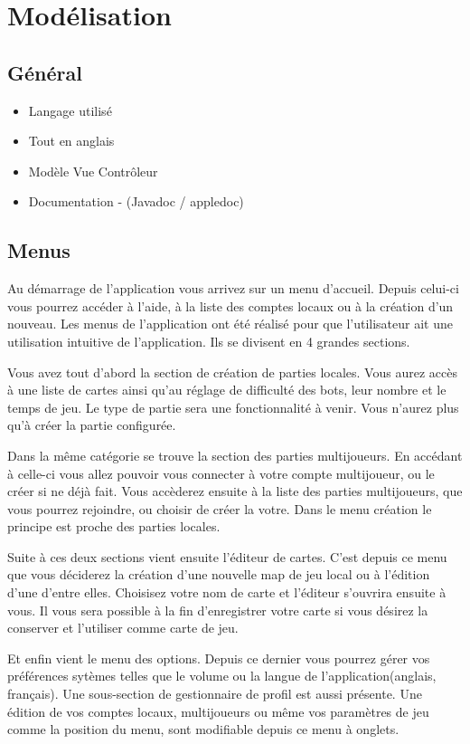 \documentclass[]{report}
\begin{document}
	\section{Modélisation}
		\subsection{Général}
			\begin{itemize}
				\item{Langage utilisé}
				\item{Tout en anglais}
				\item{Modèle Vue Contrôleur}
				\item{Documentation - (Javadoc / appledoc)}
			\end{itemize}
			
		\subsection{Menus}
		Au démarrage de l'application vous arrivez sur un menu d'accueil. Depuis
		celui-ci vous pourrez accéder à l'aide, à la liste des comptes locaux ou à la
		création d'un nouveau.
		Les menus de l'application ont été réalisé pour que l'utilisateur ait
		une utilisation intuitive de l'application. Ils se divisent en 4 grandes sections.
		
		Vous avez tout d'abord la section de création de parties locales. Vous aurez
		accès à une liste de cartes ainsi qu'au réglage de difficulté des bots, leur
		nombre et le temps de jeu. Le type de partie sera une fonctionnalité à venir.
		Vous n'aurez plus qu'à créer la partie configurée.
		
		Dans la même catégorie se trouve la section des parties multijoueurs. En
		accédant à celle-ci vous allez pouvoir vous connecter à votre compte
		multijoueur, ou le créer si ne déjà fait. Vous accèderez ensuite à la liste
		des parties multijoueurs, que vous pourrez rejoindre, ou choisir de créer la
		votre. Dans le menu création le principe est proche des parties locales.
		
		Suite à ces deux sections vient ensuite l'éditeur de cartes. C'est depuis ce
		menu que vous déciderez la création d'une nouvelle map de jeu local ou à
		l'édition d'une d'entre elles. Choisisez votre nom de carte et l'éditeur
		s'ouvrira ensuite à vous. Il vous sera possible à la fin d'enregistrer votre
		carte si vous désirez la conserver et l'utiliser comme carte de jeu.
		
		Et enfin vient le menu des options. Depuis ce dernier vous pourrez gérer vos
		préférences sytèmes telles que le volume ou la langue de
		l'application(anglais, français).
		Une sous-section de gestionnaire de profil
		est aussi présente. Une édition de vos comptes locaux, multijoueurs ou même
		vos paramètres de jeu comme la position du menu, sont modifiable depuis ce
		menu à onglets.
		
\end{document}
